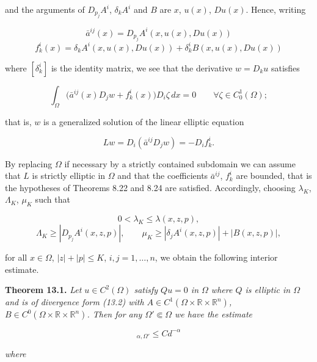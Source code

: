 
and the arguments of $D_{p_j}A^i$, $\delta_k A^i$ and $B$ are $x$, $u(x)$, $Du(x)$. Hence, writing

\[
\bar{a}^{ij}(x)=D_{p_j}A^i(x,u(x),Du(x))
\]
\[
f_k^i(x)=\delta_k A^i(x,u(x),Du(x))+\delta_k^iB(x,u(x),Du(x))
\]

where $[\delta_k^i]$ is the identity matrix, we see that the derivative $w=D_ku$ satisfies

\begin{equation}
\int_{\Omega} \bigl(\bar{a}^{ij}(x)D_jw+f_k^i(x)\bigr)D_i\zeta\,dx=0 \qquad \forall \zeta\in C_0^1(\Omega);
\tag{13.3}
\end{equation}

that is, $w$ is a generalized solution of the linear elliptic equation

\[
Lw=D_i(\bar{a}^{ij}D_jw)=-D_if_k^i.
\]

By replacing $\Omega$ if necessary by a strictly contained subdomain we can assume that
$L$ is strictly elliptic in $\Omega$ and that the coefficients $\bar{a}^{ij}$, $f_k^i$ are bounded, that is the
hypotheses of Theorems 8.22 and 8.24 are satisfied. Accordingly, choosing
$\lambda_K$, $\Lambda_K$, $\mu_K$ such that

\[
0<\lambda_K\leq \lambda(x,z,p),
\]
\begin{equation}
\Lambda_K\geq |D_{p_j}A^i(x,z,p)|,
\qquad
\mu_K\geq |\delta_jA^i(x,z,p)|+|B(x,z,p)|,
\tag{13.4}
\end{equation}

for all $x\in\Omega$, $|z|+|p|\leq K$, $i,j=1,\dots,n$, we obtain the following interior estimate.

\begin{theorem}\label{thm:gt13-holder-gradient-13-1}
\textbf{Theorem 13.1.} \textit{Let $u\in C^2(\Omega)$ satisfy $Qu=0$ in $\Omega$ where $Q$ is elliptic in $\Omega$ and is
of divergence form (13.2) with $A\in C^1(\Omega\times\mathbb{R}\times\mathbb{R}^n)$, $B\in C^0(\Omega\times\mathbb{R}\times\mathbb{R}^n)$. Then for any
$\Omega'\Subset\Omega$ we have the estimate}
\end{theorem}

\begin{equation}
[Du]_{\alpha,\Omega'}\leq Cd^{-\alpha}
\tag{13.5}
\end{equation}

\textit{where}

